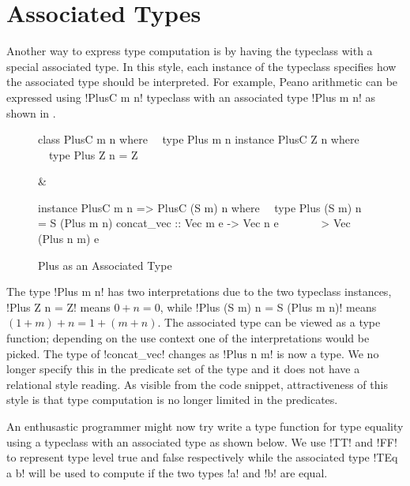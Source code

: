 \documentclass[format=acmsmall,manuscript,review,screen,nonacm,margin=1in,11pt]{acmart}
\begin{document}
\section{Associated Types}\label{sec:assoc-types}
Another way to express type computation is by having the typeclass with
a special associated type\cite{chakravarty_associated_2005}.
In this style, each instance of the typeclass specifies how the associated type should be interpreted.
For example, Peano arithmetic can be expressed using !PlusC m n! typeclass with an associated type
!Plus m n! as shown in .
\begin{figure}[ht]\centering
  \footnotesize
  \begin{tabularx}\textwidth{X X}
\begin{code}^^J
class PlusC m n where^^J
\ \ type Plus m n^^J
^^J
instance PlusC Z n where^^J
\ \ type Plus Z n = Z^^J
\end{code}&%
\begin{code}^^J
instance PlusC m n => PlusC (S m) n where^^J
\ \  type Plus (S m) n = S (Plus m n)^^J
^^J
concat_vec :: Vec m e -> Vec n e^^J
\ \ \ \ \ \ \ \-> Vec (Plus n m) e^^J
\end{code}
  \end{tabularx}
  \caption{Plus as an Associated Type}
  \label{fig:plus-assoc-type}
\end{figure}

The type !Plus m n! has two interpretations due to the two typeclass instances,
!Plus Z n  = Z! means $0 + n = 0$, while !Plus (S m) n = S (Plus m n)! means $(1 + m) + n = 1 + (m + n)$. 
The associated type can be viewed as a type function; depending on the use context
one of the interpretations would be picked.
The type of !concat_vec! changes as !Plus n m! is now a type.
We no longer specify this in the predicate set of the type and
it does not have a relational style reading. As visible from the code snippet,
attractiveness of this style is that type computation is
no longer limited in the predicates.

An enthusastic programmer might now try write a type function for type equality
using a typeclass with an associated type as shown below.
We use !TT! and !FF! to represent type level true and false respectively while
the associated type !TEq a b! will be used to compute if the two types !a! and !b! are equal.
\end{document}
